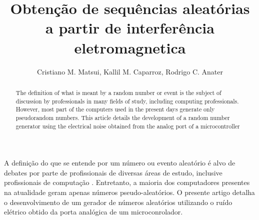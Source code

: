 \documentclass[
12pt,				%
openright,			%
twoside,			%
a4paper,			%
sumario=tradicional, %
hidelinks,          %
num,				%
bibjustif,			%
brackets,			%
english,			%
brazil				%
]{article}       %
\title{Obtenção de sequências aleatórias a partir de interferência eletromagnetica}
\author{Cristiano M. Matsui\inst{1}, Kallil M. Caparroz\inst{2}, Rodrigo C. Anater\inst{3} }
\begin{document}
 

  \maketitle

\begin{abstract} 	
 	The definition of what is meant by a random number or event is the subject of discussion by professionals in many fields of study, including computing professionals. However, most part of the computers used in the present days generate only pseudorandom numbers. This article details the development of a random number generator using the electrical noise obtained from the analog port of a microcontroller
\end{abstract}
     
\begin{resumo} 
 	A definição do que se entende por um número ou evento aleatório é alvo de debates por parte de profissionais de diversas áreas de estudo, inclusive profissionais de computação \cite{volchan2001algorithmic}. Entretanto, a maioria dos computadores presentes na atualidade geram apenas números pseudo-aleatórios. O presente artigo detalha o desenvolvimento de um gerador de números aleatórios utilizando o ruído elétrico obtido da porta analógica de um microconrolador.  
\end{resumo}









\nocite{park1988random}


\end{document}
